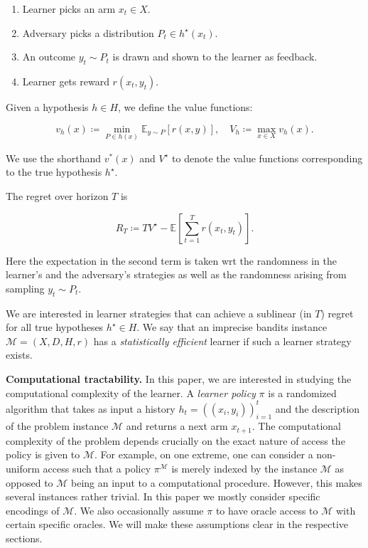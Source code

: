 \begin{enumerate}
\item Learner picks an arm $x_{t} \in X$.

\item Adversary picks a distribution $P_{t} \in h^{\star} \left( x_{t} \right)$.

\item An outcome $y_{t} \sim P_{t}$ is drawn and shown to the learner as feedback.

\item Learner gets reward $r \left( x_{t} , y_{t} \right)$.

\end{enumerate}
Given a hypothesis $h \in H$, we define the value functions:


\begin{equation*}
v_{h} \left( x \right) \coloneqq \operatorname*{min}_{P \in h \left( x \right)} \mathbb{E}_{y \sim P} \left[ r \left( x , y \right) \right] , \quad V_{h} \coloneqq \operatorname*{max}_{x \in X} v_{h} \left( x \right) .
\end{equation*}


We use the shorthand $v^{\ast} \left( x \right)$ and $V^{\star}$ to denote the value functions corresponding to the true hypothesis $h^{\star}$.

The regret over horizon $T$ is


\begin{equation*}
R_{T} \coloneqq T V^{\star} - \mathbb{E} \left[ \sum_{t = 1}^{T} r \left( x_{t} , y_{t} \right) \right] .
\end{equation*}


Here the expectation in the second term is taken wrt the randomness in the learner's and the adversary's strategies as well as the randomness arising from sampling $y_{t} \sim P_{t}$.

We are interested in learner strategies that can achieve a sublinear (in $T$) regret for all true hypotheses $h^{\star} \in H$. We say that an imprecise bandits instance $\mathcal{M} = \left( X , D , H , r \right)$ has a \emph{statistically efficient} learner if such a learner strategy exists.

\textbf{Computational tractability.} In this paper, we are interested in studying the computational complexity of the learner. A \emph{learner policy} $\pi$ is a randomized algorithm that takes as input a history $h_{t} = {\left( \left( x_{i} , y_{i} \right) \right)}_{i = 1}^{t}$ and the description of the problem instance $\mathcal{M}$ and returns a next arm $x_{t + 1}$. The computational complexity of the problem depends crucially on the exact nature of access the policy is given to $\mathcal{M}$. For example, on one extreme, one can consider a non-uniform access such that a policy $\pi^{\mathcal{M}}$ is merely indexed by the instance $\mathcal{M}$ as opposed to $\mathcal{M}$ being an input to a computational procedure. However, this makes several instances rather trivial. In this paper we mostly consider specific encodings of $\mathcal{M}$. We also occasionally assume $\pi$ to have oracle access to $\mathcal{M}$ with certain specific oracles. We will make these assumptions clear in the respective sections.


